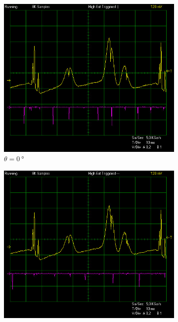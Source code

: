 \documentclass{article}
\begin{document}
\begin{figure}[h]
    \centering
    \begin{subfigure}[b]{0.3\textwidth}
        \centering
        \includegraphics[width=\linewidth]{Figures/3/0deg.jpg}
        \caption{$\theta = \SI{0}{\degree}$}
        \label{fig:figure0}
    \end{subfigure}
    \begin{subfigure}[b]{0.3\textwidth}
        \centering
        \includegraphics[width=\linewidth]{Figures/3/45deg.jpg}

\end{subfigure}
\end{figure}
\end{document}

